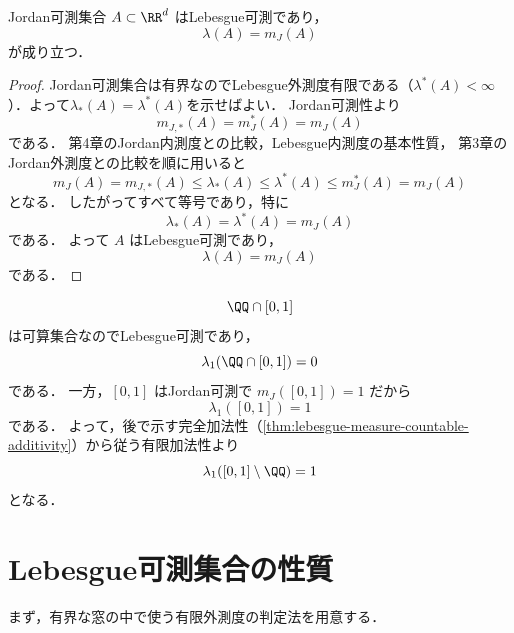 \begin{theorem}[Jordan可測集合]\label{thm:jordan-measurable-lebesgue}
Jordan可測集合 $A\subset\RR^d$ はLebesgue可測であり，
\[
\lambda(A)=m_J(A)
\]
が成り立つ．
\end{theorem}
\begin{proof}
    Jordan可測集合は有界なのでLebesgue外測度有限である（$\lambda^*(A) < \infty$）．よって$\lambda_*(A)=\lambda^*(A)$を示せばよい．
Jordan可測性より
\[
m_{J,*}(A)=m_J^*(A)=m_J(A)
\]
である．
第4章のJordan内測度との比較，Lebesgue内測度の基本性質，
第3章のJordan外測度との比較を順に用いると
\[
m_J(A)
=m_{J,*}(A)
\le \lambda_*(A)
\le \lambda^*(A)
\le m_J^*(A)
=m_J(A)
\]
となる．
したがってすべて等号であり，特に
\[
\lambda_*(A)=\lambda^*(A)=m_J(A)
\]
である．
よって $A$ はLebesgue可測であり，
\[
\lambda(A)=m_J(A)
\]
である．
\end{proof}

\begin{example}
\[
\QQ\cap[0,1]
\]
は可算集合なのでLebesgue可測であり，
\[
\lambda_1(\QQ\cap[0,1])=0
\]
である．
一方，$[0,1]$ はJordan可測で $m_J([0,1])=1$ だから
\[
\lambda_1([0,1])=1
\]
である．
よって，後で示す完全加法性（\cref{thm:lebesgue-measure-countable-additivity}）から従う有限加法性より
\[
\lambda_1([0,1]\setminus\QQ)=1
\]
となる．
\end{example}

\section{Lebesgue可測集合の性質}

まず，有界な窓の中で使う有限外測度の判定法を用意する．


